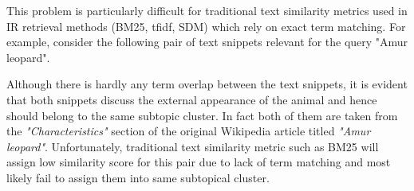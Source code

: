\documentclass[sigconf,authordraft]{acmart}
\begin{document}
This problem is particularly difficult for traditional text similarity metrics used in IR retrieval methods (BM25, tfidf, SDM) which rely on exact term matching. For example, consider the following pair of text snippets relevant for the query "Amur leopard".

\noindent{}
\noindent{}

Although there is hardly any term overlap between the text snippets, it is evident that both snippets discuss the external appearance of the animal and hence should belong to the same subtopic cluster. In fact both of them are taken from the \textit{"Characteristics"} section of the original Wikipedia article titled \textit{"Amur leopard"}. Unfortunately, traditional text similarity metric such as BM25 will assign low similarity score for this pair due to lack of term matching and most likely fail to assign them into same subtopical cluster.


\end{document}

